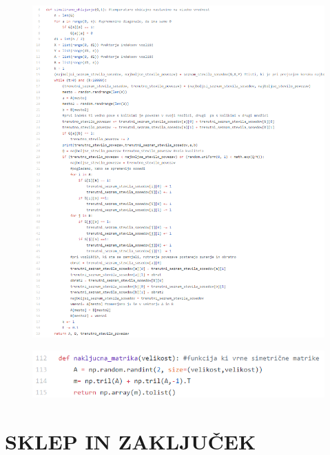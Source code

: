 \documentclass[12pt,a4paper]{amsart}
\theoremstyle{definition} %
\theoremstyle{plain} %
\begin{document}
\FloatBarrier
\begin{figure}
  \centering
  \includegraphics{simulirano}
\end{figure}
\FloatBarrier

\FloatBarrier
\begin{figure}
  \centering
  \includegraphics{matrike}
\end{figure}
\FloatBarrier

\newpage

\section{\textbf{SKLEP IN ZAKLJUČEK}}
\end{document}
